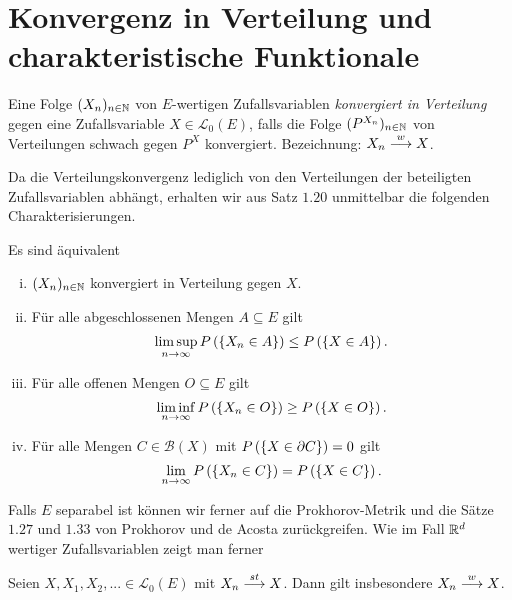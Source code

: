 \section{Konvergenz in Verteilung und charakteristische Funktionale}

\begin{mydef}
    Eine Folge $(X_n)_{n \in \mathbb{N}}$ von $E$-wertigen Zufallsvariablen \textit{konvergiert in Verteilung} gegen eine Zufallsvariable $X \in \mathcal{L}_0(E)$,
    falls die Folge $(P^{X_n})_{n \in \mathbb{N}}$ von Verteilungen schwach gegen $P^X$ konvergiert. 
    \newline 
    Bezeichnung: $X_n \overset{w}{\longrightarrow} X$. 
\end{mydef}

Da die Verteilungskonvergenz lediglich von den Verteilungen der beteiligten Zufallsvariablen abhängt, erhalten wir aus Satz $1.20$ unmittelbar die folgenden Charakterisierungen.
\begin{proposition}
    Es sind äquivalent
    \begin{enumerate}[(i)]
        \item $(X_n)_{n \in \mathbb{N}}$ konvergiert in Verteilung gegen $X$. 
        \item Für alle abgeschlossenen Mengen $A \subseteq E$ gilt 
        $$
            \limsup_{n \to \infty}P\left(\left\{ X_n \in A \right\}\right) \leq P\left(\left\{ X \in A \right\}\right).
        $$
        \item Für alle offenen Mengen $O \subseteq E$ gilt
        $$
            \liminf_{n \to \infty}P\left(\left\{ X_n \in O \right\}\right) \geq P\left(\left\{ X \in O \right\}\right).
        $$
        \item Für alle Mengen $C \in \mathcal{B}(X)$ mit $P\left(\left\{ X \in \partial C \right\}\right) = 0$ gilt 
        $$
            \lim_{n \to \infty}P\left(\left\{ X_n \in C \right\}\right) = P\left(\left\{ X \in C \right\}\right). 
        $$
    \end{enumerate}
\end{proposition}

Falls $E$ separabel ist können wir ferner auf die Prokhorov-Metrik und die Sätze $1.27$ und $1.33$ von Prokhorov und de Acosta zurückgreifen. Wie im Fall $\mathbb{R}^d$ wertiger Zufallsvariablen zeigt man ferner 
\begin{proposition}
    Seien $X,X_1,X_2,... \in \mathcal{L}_0(E)$ mit $X_n \overset{st}{\longrightarrow} X$. Dann gilt insbesondere $X_n \overset{w}{\longrightarrow} X$. 
\end{proposition}\ 
\newline




